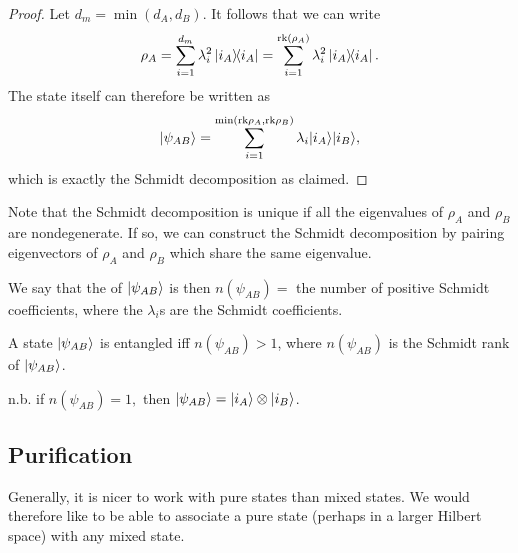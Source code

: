\begin{proof}
    Let $d_m=\min(d_A,d_B)$. It follows that we can write
    \begin{equation}
        \rho_A = \sum_{i=1}^{d_m} \lambda_i^2 \left\lvert{i_A}\middle\rangle\!\middle\langle{i_A}\right\rvert = \sum_{i=1}^{\text{rk}(\rho_A)}\lambda_i^2 \left\lvert{i_A}\middle\rangle\!\middle\langle{i_A}\right\rvert.
    \end{equation}
    The state itself can therefore be written as
    \begin{equation}
        \lvert\psi_{AB}\rangle=\sum_{i=1}^{\min(\text{rk}\rho_A,\text{rk}\rho_B)} \lambda_i \lvert i_A\rangle \lvert i_B\rangle,
    \end{equation}
    which is exactly the Schmidt decomposition as claimed.
\end{proof}

Note that the Schmidt decomposition is unique if all the eigenvalues of $\rho_A$ and $\rho_B$ are nondegenerate. If so, we can construct the Schmidt decomposition by pairing eigenvectors of $\rho_A$ and $\rho_B$ which share the same eigenvalue.

\begin{defn}
    We say that the  of $\lvert\psi_{AB}\rangle$ is then $n(\psi_{AB})={}$ the number of positive Schmidt coefficients, where the $\lambda_i$s are the Schmidt coefficients.
\end{defn}

\begin{thm}
    A state $\lvert\psi_{AB}\rangle$ is entangled iff $n(\psi_{AB}) >1$, where $n(\psi_{AB})$ is the Schmidt rank of $\lvert\psi_{AB}\rangle$.
\end{thm}
n.b. if $n(\psi_{AB})=1,$ then $\lvert\psi_{AB}\rangle=\lvert i_A\rangle\otimes \lvert i_B\rangle$.

\subsection*{Purification} Generally, it is nicer to work with pure states than mixed states. We would therefore like to be able to associate a pure state (perhaps in a larger Hilbert space) with any mixed state.

